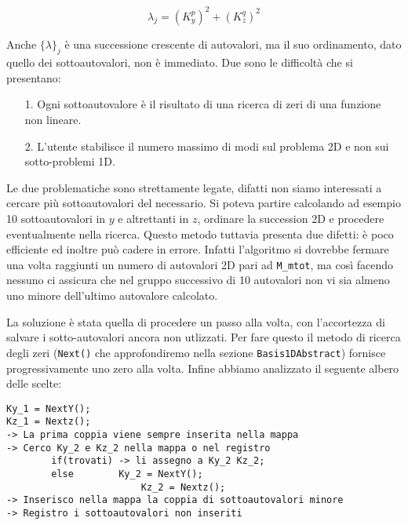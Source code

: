 \begin{equation}
\label{eq: autovalori}
 \lambda_j = (K_y^p)^2 + (K_z^q)^2
\end{equation} 

Anche $\{\lambda\}_j$ \`e una successione crescente di autovalori, ma il suo ordinamento, dato quello dei sottoautovalori, non \`e immediato. Due sono le difficolt\`a che si presentano:
\begin{itemize}
\item[1.] Ogni sottoautovalore \`e il risultato di una ricerca di zeri di una funzione non lineare.
\item[2.] L'utente stabilisce il numero massimo di modi sul problema 2D e non sui sotto-problemi 1D.
\end{itemize}

Le due problematiche sono strettamente legate, difatti non siamo interessati a cercare pi\`u sottoautovalori del necessario. Si poteva partire calcolando ad esempio 10 sottoautovalori in $y$ e altrettanti in $z$, ordinare la succession 2D e procedere eventualmente nella ricerca. Questo metodo tuttavia presenta due difetti: \`e poco efficiente ed inoltre pu\`o cadere in errore. Infatti l'algoritmo si dovrebbe fermare una volta raggiunti un numero di autovalori 2D pari ad \texttt{M\_mtot}, ma cos\`i facendo nessuno ci assicura che nel gruppo successivo di 10 autovalori non vi sia almeno uno minore dell'ultimo autovalore calcolato.

La soluzione \`e stata quella di procedere un passo alla volta, con l'accortezza di salvare i sotto-autovalori ancora non utlizzati. Per fare questo il metodo di ricerca degli zeri (\texttt{Next()} che approfondiremo nella sezione \texttt{Basis1DAbstract}) fornisce progressivamente uno zero alla volta. Infine abbiamo analizzato il seguente albero delle scelte:

\begin{lstlisting}[style = general,frame = top]
Ky_1 = NextY();
Kz_1 = Nextz();
-> La prima coppia viene sempre inserita nella mappa
-> Cerco Ky_2 e Kz_2 nella mappa o nel registro
		if(trovati) -> li assegno a Ky_2 Kz_2;
		else		Ky_2 = NextY();
						Kz_2 = Nextz();
-> Inserisco nella mappa la coppia di sottoautovalori minore
-> Registro i sottoautovalori non inseriti
\end{lstlisting}


